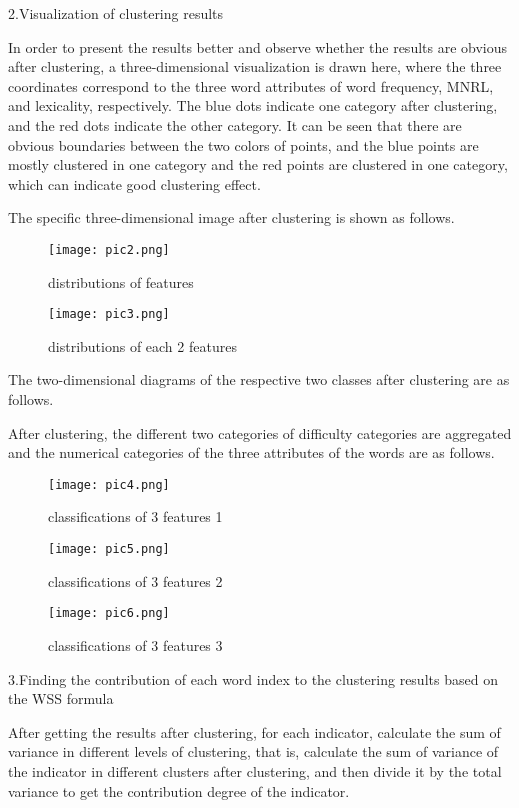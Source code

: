 \documentclass[12pt]{article}  %
\begin{document}
2.Visualization of clustering results

In order to present the results better and observe whether the results are obvious after clustering, a three-dimensional visualization is drawn here, where the three coordinates correspond to the three word attributes of word frequency, MNRL, and lexicality, respectively. The blue dots indicate one category after clustering, and the red dots indicate the other category. 	It can be seen that there are obvious boundaries between the two colors of points, and the blue points are mostly clustered in one category and the red points are clustered in one category, which can indicate good clustering effect.

The specific three-dimensional image after clustering is shown as follows.
\begin{figure}[H]
	\centering
	\texttt{[image: pic2.png]}
	\caption{distributions of features}
	\label{img14}
\end{figure}
\begin{figure}[H]
	\centering
	\texttt{[image: pic3.png]}
	\caption{distributions of each 2 features}
	\label{img15}
\end{figure}
The two-dimensional diagrams of the respective two classes after clustering are as follows.

After clustering, the different two categories of difficulty categories are aggregated and the numerical categories of the three attributes of the words are as follows.
\begin{figure}[H]
	\centering
	\texttt{[image: pic4.png]}
	\caption{classifications of 3 features 1}
	\label{img16}
\end{figure}
\begin{figure}[H]
	\centering
	\texttt{[image: pic5.png]}
	\caption{classifications of 3 features 2}
	\label{img17}
\end{figure}
\begin{figure}[H]
	\centering
	\texttt{[image: pic6.png]}
	\caption{classifications of 3 features 3}
	\label{img18}
\end{figure}
3.Finding the contribution of each word index to the clustering results based on the WSS formula

After getting the results after clustering, for each indicator, calculate the sum of variance in different levels of clustering, that is, calculate the sum of variance of the indicator in different clusters after clustering, and then divide it by the total variance to get the contribution degree of the indicator.
\end{document}
